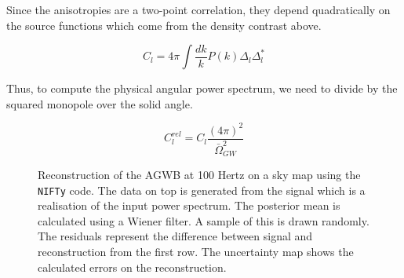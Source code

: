 Since the anisotropies are a two-point correlation, they depend quadratically on the source functions which come from the density contrast above.

\begin{equation}
    C_l = 4\pi \int \frac{dk}{k} P(k) \Delta_l \Delta_l^*
\end{equation}

Thus, to compute the physical angular power spectrum, we need to divide by the squared monopole over the solid angle.

\begin{equation}
    C_l^{rel}=C_l \frac{(4\pi)^2}{\bar{\Omega}_{GW}^2}
\end{equation}
\begin{figure}[h]
    \centering
    \newline
    \vspace{-1.5cm}
    \caption[Reconstruction of the AGWB at 100 Hertz on a sky map using the {\tt NIFTy} code.]{Reconstruction of the AGWB at 100 Hertz on a sky map using the {\tt NIFTy} code. The data on top is generated from the signal which is a realisation of the input power spectrum. The posterior mean is calculated using a Wiener filter. A sample of this is drawn randomly. The residuals represent the difference between signal and reconstruction from the first row. The uncertainty map shows the calculated errors on the reconstruction.}
    \label{sky_maps_100}
\end{figure}

